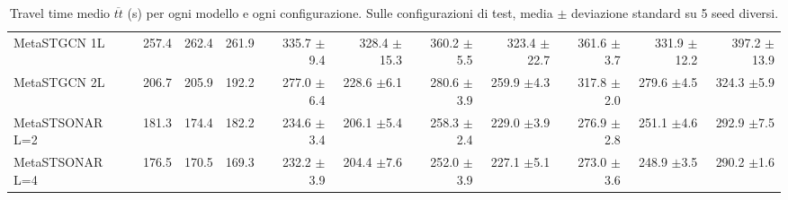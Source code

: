 \begin{table}
\begin{tabular}{@{}lrrrrrrrrrr@{}}
    MetaSTGCN 1L              & 257.4   & 262.4   & 261.9   & 335.7 {\fontsize{4}{4}\selectfont$\pm$9.4} & 328.4 {\fontsize{4}{4}\selectfont$\pm$15.3} & 360.2 {\fontsize{4}{4}\selectfont$\pm$5.5} & 323.4 {\fontsize{4}{4}\selectfont$\pm$22.7} & 361.6 {\fontsize{4}{4}\selectfont$\pm$3.7} & 331.9 {\fontsize{4}{4}\selectfont$\pm$12.2} & 397.2 {\fontsize{4}{4}\selectfont$\pm$13.9} \\
    MetaSTGCN 2L              & 206.7   & 205.9   & 192.2   & 277.0 {\fontsize{4}{4}\selectfont$\pm$6.4} & 228.6 {\fontsize{4}{4}\selectfont$\pm$6.1}  & 280.6 {\fontsize{4}{4}\selectfont$\pm$3.9} & 259.9 {\fontsize{4}{4}\selectfont$\pm$4.3}  & 317.8 {\fontsize{4}{4}\selectfont$\pm$2.0} & 279.6 {\fontsize{4}{4}\selectfont$\pm$4.5}  & 324.3 {\fontsize{4}{4}\selectfont$\pm$5.9}  \\
    MetaSTSONAR L=2           & 181.3   & 174.4   & 182.2   & 234.6 {\fontsize{4}{4}\selectfont$\pm$3.4} & 206.1 {\fontsize{4}{4}\selectfont$\pm$5.4}  & 258.3 {\fontsize{4}{4}\selectfont$\pm$2.4} & 229.0 {\fontsize{4}{4}\selectfont$\pm$3.9}  & 276.9 {\fontsize{4}{4}\selectfont$\pm$2.8} & 251.1 {\fontsize{4}{4}\selectfont$\pm$4.6}  & 292.9 {\fontsize{4}{4}\selectfont$\pm$7.5}  \\
    MetaSTSONAR L=4           & 176.5   & 170.5   & 169.3   & 232.2 {\fontsize{4}{4}\selectfont$\pm$3.9} & 204.4 {\fontsize{4}{4}\selectfont$\pm$7.6}  & 252.0 {\fontsize{4}{4}\selectfont$\pm$3.9} & 227.1 {\fontsize{4}{4}\selectfont$\pm$5.1}  & 273.0 {\fontsize{4}{4}\selectfont$\pm$3.6} & 248.9 {\fontsize{4}{4}\selectfont$\pm$3.5}  & 290.2 {\fontsize{4}{4}\selectfont$\pm$1.6}  \\
    \bottomrule
  \end{tabular}
  \caption{Travel time medio $\overline{tt}$ (s) per ogni modello e ogni configurazione. Sulle configurazioni di test, media $\pm$ deviazione standard su 5 seed diversi.}
  \label{tab:ttmedio-full}
\end{table}


